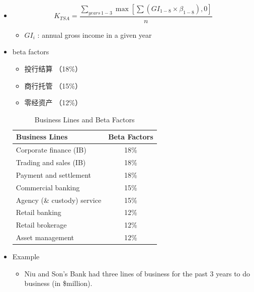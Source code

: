 \begin{itemize}
It captures operational risk factors, because different types of business activities carry different levels of operational risk.
    \begin{itemize}
    \item Beta factor($\beta$) is a fixed percentage, which reflects the level of the gross income for each of the eight business lines.
    \end{itemize}
\item \begin{equation}
    K_{TSA} = \frac{\sum_{years \, 1-3} \max\left[\sum(GI_{1-8} \times \beta_{1-8}), 0\right]}{n}
    \end{equation}
    \begin{itemize}
        \item $GI_i$ : annual gross income in a given year
        \end{itemize}
\item beta factors
    \begin{itemize}
    \item 投行结算 （18\%）
    \item 商行托管 （15\%）
    \item 零经资产 （12\%）
    \end{itemize}
    \begin{table}[h]
        \centering
        \caption{Business Lines and Beta Factors}
        \begin{tabular}{|l|c|}
            \hline
            \textbf{Business Lines} & \textbf{Beta Factors} \\
            \hline
            Corporate finance (IB) & 18\% \\
            Trading and sales (IB) & 18\% \\
            Payment and settlement & 18\% \\
            Commercial banking & 15\% \\
            Agency (\& custody) service & 15\% \\
            Retail banking & 12\% \\
            Retail brokerage & 12\% \\
            Asset management & 12\% \\
            \hline
        \end{tabular}
    \end{table}

\item Example
    \begin{itemize}
    \item Niu and Son's Bank had three lines of business for the past 3 years to do business (in \$million).
    

\end{itemize}
\end{itemize}
